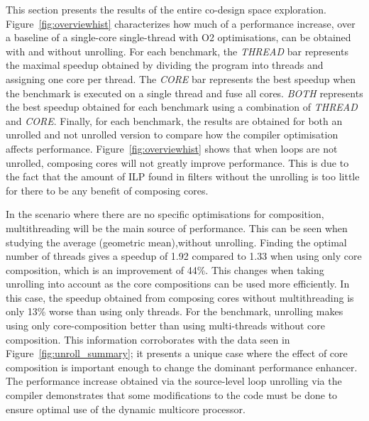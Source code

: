 This section  presents the results of the entire co-design space exploration.
Figure~\ref{fig:overviewhist} characterizes how much of a performance increase, over a baseline of a single-core single-thread with O2 optimisations, can be obtained with and without unrolling.
For each benchmark, the \textit{THREAD} bar represents the maximal speedup obtained by dividing the program into threads and assigning one core per thread.
The \textit{CORE} bar represents the best speedup when the benchmark is executed on a single thread and fuse all cores.
\textit{BOTH} represents the best speedup obtained for each benchmark using a combination of \textit{THREAD} and \textit{CORE}.
Finally, for each benchmark, the results are obtained for both an unrolled and not unrolled version to compare how the compiler optimisation affects performance.
Figure~\ref{fig:overviewhist} shows that when loops are not unrolled, composing cores will not greatly improve performance.
This is due to the fact that the amount of ILP found in filters without the unrolling is too little for there to be any benefit of composing cores.

In the scenario where there are no specific optimisations for composition, multithreading will be the main source of performance.
This can be seen when studying the average (geometric mean),without unrolling.
Finding the optimal number of threads gives a speedup of 1.92 compared to 1.33 when using only core composition, which is an improvement of 44\%.
This changes when taking unrolling into account as the core compositions can be used more efficiently.
In this case, the speedup obtained from composing cores without multithreading is only 13\% worse than using only threads.
For the  benchmark, unrolling makes using only core-composition better than using multi-threads without core composition.
This information corroborates with the data seen in Figure~\ref{fig:unroll_summary}; it presents a unique case where the effect of core composition is important enough to change the dominant performance enhancer.
The performance increase obtained via the source-level loop unrolling via the compiler demonstrates that some modifications to the code must be done to ensure optimal use of the dynamic multicore processor.


